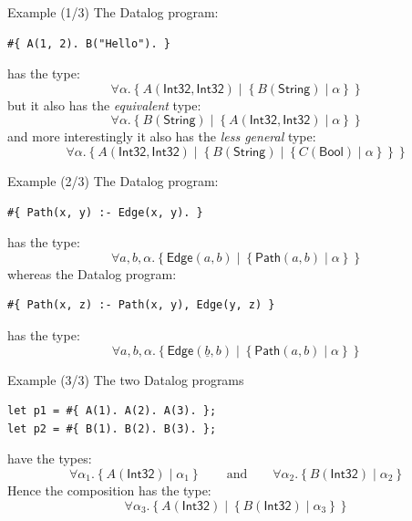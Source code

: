 \begin{frame}[fragile]{Example (1/3)}
The Datalog program:
%
\begin{lstlisting}[language=flix, xleftmargin=0.8cm]
#{ A(1, 2). B("Hello"). }
\end{lstlisting}    
%
has the type:
%
\[
\forall \alpha. \left\{ A(\textsf{Int32}, \textsf{Int32}) \mid \left\{ B(\textsf{String}) \mid \alpha \right\} \right\}
\]
%
\pause but it also has the \emph{equivalent} type:
%
\[
\forall \alpha. \left\{ B(\textsf{String}) \mid \left\{ A(\textsf{Int32}, \textsf{Int32}) \mid \alpha \right\} \right\}
\]
%
\pause and more interestingly it also has the \emph{less general} type:
%
\[
\forall \alpha. \left\{ A(\textsf{Int32}, \textsf{Int32}) \mid \left\{ B(\textsf{String}) \mid \left\{ C(\textsf{Bool}) \mid \alpha \right\} \right\} \right\}
\]
%
\end{frame}

\begin{frame}[fragile]{Example (2/3)}
The Datalog program:
%
\begin{lstlisting}[language=flix, xleftmargin=0.8cm]
#{ Path(x, y) :- Edge(x, y). }
\end{lstlisting}    
%
has the type:
%
\[
\forall a, b, \alpha. \left\{ \textsf{Edge}(a, b) \mid \left\{ \textsf{Path}(a, b) \mid \alpha \right\} \right\}
\]
%
\pause whereas the Datalog program:
%
\begin{lstlisting}[language=flix, xleftmargin=0.8cm]
#{ Path(x, z) :- Path(x, y), Edge(y, z) }
\end{lstlisting}    
%
\pause has the type:
%
\[
\forall a, b, \alpha. \left\{ \textsf{Edge}(\underline{b}, b) \mid \left\{ \textsf{Path}(a, b) \mid \alpha \right\} \right\}
\]
%
\end{frame}

\begin{frame}[fragile]{Example (3/3)}
The two Datalog programs
%
\begin{lstlisting}[language=flix, xleftmargin=0.8cm]
let p1 = #{ A(1). A(2). A(3). };
let p2 = #{ B(1). B(2). B(3). };
\end{lstlisting}    
%
have the types:
%
\[
\forall \alpha_1. \left\{ A(\textsf{Int32}) \mid \alpha_1 \right\}
\qquad \text{and} \qquad
\forall \alpha_2. \left\{ B(\textsf{Int32}) \mid \alpha_2 \right\}
\]
%
\pause Hence the composition  has the type:
%
\[
\forall \alpha_3. \left\{ A(\textsf{Int32}) \mid \left\{ B(\textsf{Int32}) \mid \alpha_3 \right\} \right\}
\]
%
\end{frame}

